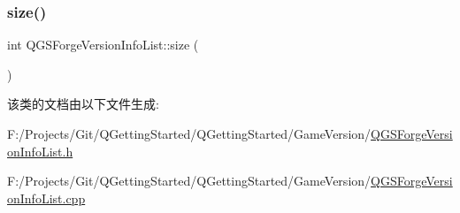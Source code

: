 \mbox{\label{class_q_g_s_forge_version_info_list_a240177f3ffee99e374b44ec3ce95c688}} 
\subsubsection{\texorpdfstring{size()}{size()}}
{\footnotesize\ttfamily int Q\+G\+S\+Forge\+Version\+Info\+List\+::size (\begin{DoxyParamCaption}{ }\end{DoxyParamCaption})}



该类的文档由以下文件生成\+:\begin{DoxyCompactItemize}
\item 
F\+:/\+Projects/\+Git/\+Q\+Getting\+Started/\+Q\+Getting\+Started/\+Game\+Version/\mbox{\hyperlink{_q_g_s_forge_version_info_list_8h}{Q\+G\+S\+Forge\+Version\+Info\+List.\+h}}\item 
F\+:/\+Projects/\+Git/\+Q\+Getting\+Started/\+Q\+Getting\+Started/\+Game\+Version/\mbox{\hyperlink{_q_g_s_forge_version_info_list_8cpp}{Q\+G\+S\+Forge\+Version\+Info\+List.\+cpp}}\end{DoxyCompactItemize}
